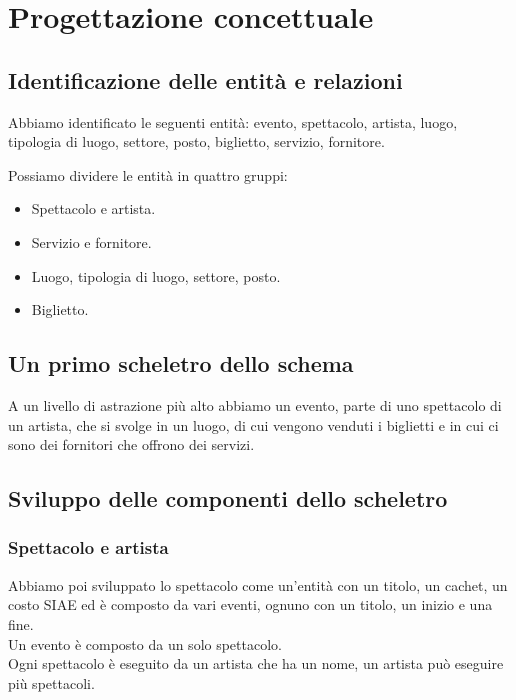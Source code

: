 \documentclass[a4paper,11pt]{article}
\begin{document}
\section{Progettazione concettuale}

\subsection{Identificazione delle entità e relazioni}

Abbiamo identificato le seguenti entità: evento, spettacolo, artista, luogo, tipologia di luogo, settore, posto, biglietto, servizio, fornitore.

Possiamo dividere le entità in quattro gruppi:

\begin{itemize}
    \item Spettacolo e artista.
    \item Servizio e fornitore.
    \item Luogo, tipologia di luogo, settore, posto.
    \item Biglietto.
\end{itemize}

\subsection{Un primo scheletro dello schema}

A un livello di astrazione più alto abbiamo un evento, parte di uno spettacolo di un artista, che si svolge in un luogo, di cui vengono venduti i biglietti e in cui ci sono dei fornitori che offrono dei servizi.

 
\subsection{Sviluppo delle componenti dello scheletro}

\subsubsection*{Spettacolo e artista}

Abbiamo poi sviluppato lo spettacolo come un'entità con un titolo, un cachet, un costo SIAE ed è composto da vari eventi, ognuno con un titolo, un inizio e una fine.\\
Un evento è composto da un solo spettacolo.\\
Ogni spettacolo è eseguito da un artista che ha un nome, un artista può eseguire più spettacoli.
\end{document}
